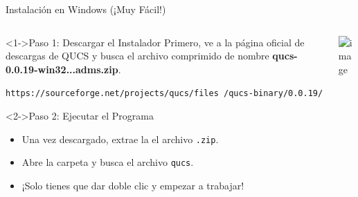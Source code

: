 \documentclass{beamer}
\begin{document}
\begin{frame}[fragile]{Instalación en Windows (¡Muy Fácil!)}

  \begin{columns}[T] %
    
    \begin{column}{0.5\textwidth}
      
      \begin{block}<1->{Paso 1: Descargar el Instalador}
        Primero, ve a la página oficial de descargas de QUCS y busca el archivo comprimido de nombre \textbf{qucs-0.0.19-win32...adms.zip}.
        \vspace{0.2cm}
        
        \tiny{\texttt{https://sourceforge.net/projects/qucs/files /qucs-binary/0.0.19/}}
      \end{block}
      
      \begin{block}<2->{Paso 2: Ejecutar el Programa}
        \begin{itemize}
          \item Una vez descargado, extrae la el archivo \texttt{.zip}.
          \item Abre la carpeta y busca el archivo \texttt{qucs}.
          \item ¡Solo tienes que dar doble clic y empezar a trabajar!
        \end{itemize}
      \end{block}
      
    \end{column}
    
    \begin{column}{0.5\textwidth}
      
      \includegraphics<1->[width=\columnwidth]{Imagenes/InsWinP1.png}
      
      

\end{column}
\end{columns}
\end{frame}
\end{document}

